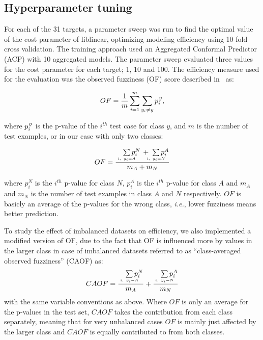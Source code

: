 \documentclass[10pt,article]{memoir}
\begin{document}
\subsection{Hyperparameter tuning}
For each of the 31 targets, a parameter sweep was run to find the optimal value of the
cost parameter of liblinear, optimizing modeling efficiency using 10-fold cross validation. The training
approach used an Aggregated Conformal Predictor (ACP) with 10 aggregated models.
The parameter sweep evaluated three values for the cost parameter for each target; 1, 10 and 100. The
efficiency measure used for the evaluation was the observed fuzziness (OF)
score described in~\cite{Vovk2016} as:

\begin{equation}
OF =\frac{ 1}{m} \sum\limits_{i=1}^{m} \sum\limits_{y_i \neq y }  p_i^{\kern1pt y},		
\end{equation}

where $p_i^{\kern1pt y}$ is the p-value of the $i^{th}$ test case for class $y$, and $m$ is the number of test examples, or in our case with only two classes:

\begin{equation}
OF =  \frac
        {\quad\sum\limits_{\mathclap{\substack{\scriptscriptstyle i,\ y_i=A}}}p_i^N \, + \;\sum\limits_{\mathclap{\substack{\scriptscriptstyle i,\ y_i=N}}}p_i^A}
        {m_A + m_N} 
\end{equation}

where $p_i^N$ is the $i^{th}$ p-value for class $N$, $p_i^A$ is the $i^{th}$
p-value for class $A$ and $m_A$ and $m_N$ is the number of test examples in
class $A$ and $N$ respectively. $OF$ is basicly an average of the p-values for
the wrong class, \textit{i.e.}, lower fuzziness means better prediction.

To study the effect of imbalanced datasets on efficiency, we also implemented a
modified version of OF, due to the fact that OF is influenced more
by values in the larger class in case of imbalanced datasets referred to as
``class-averaged
observed fuzziness'' (CAOF) as:
\begin{equation}
CAOF = \frac
        {\quad\sum\limits_{\mathclap{\substack{\scriptscriptstyle i,\ y_i=A}}}p_i^N}
        {m_A}
       + \frac 
        {\quad\sum\limits_{\mathclap{\substack{\scriptscriptstyle i,\ y_i=N}}}p_i^A}
        {m_N} 
\end{equation}
with the same variable conventions as above. Where $OF$ is only an average for
the p-values in the test set, $CAOF$ takes the contribution from each class
separately, meaning that for very unbalanced cases $OF$ is mainly just affected
by the larger class and $CAOF$ is equally contributed to from both classes.
\end{document}
